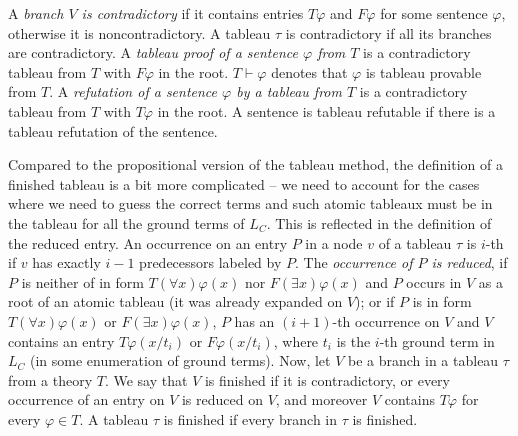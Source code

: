 
A \emph{branch $V$ is contradictory} if it contains entries $T \varphi$ and $F \varphi$ for some sentence $\varphi$, otherwise it is noncontradictory. A tableau $\tau$ is contradictory if all its branches are contradictory. A \emph{tableau proof of a sentence $\varphi$ from $T$} is a contradictory tableau from $T$ with $F \varphi$ in the root. $T \vdash \varphi$ denotes that $\varphi$ is tableau provable from $T$. A \emph{refutation of a sentence $\varphi$ by a tableau from $T$} is a contradictory tableau from $T$ with $T \varphi$ in the root. A sentence is tableau refutable if there is a tableau refutation of the sentence.

Compared to the propositional version of the tableau method, the definition of a finished tableau is a bit more complicated -- we need to account for the cases where we need to guess the correct terms and such atomic tableaux must be in the tableau for all the ground terms of $L_C$. This is reflected in the definition of the reduced entry. An occurrence on an entry $P$ in a node $v$ of a tableau $\tau$ is $i$-th if $v$ has exactly $i-1$ predecessors labeled by $P$. The \emph{occurrence of $P$ is reduced}, if $P$ is neither of in form $T(\forall x)\varphi(x)$ nor $F(\exists x)\varphi(x)$ and $P$ occurs in $V$ as a root of an atomic tableau (it was already expanded on $V$); or if $P$ is in form $T(\forall x)\varphi(x)$ or $F(\exists x)\varphi(x)$, $P$ has an $(i+1)$-th occurrence on $V$ and $V$ contains an entry $T \varphi(x/t_i)$ or $F \varphi(x/t_i)$, where $t_i$ is the $i$-th ground term in $L_C$ (in some enumeration of ground terms). Now, let $V$ be a branch in a tableau $\tau$ from a theory $T$. We say that $V$ is finished if it is contradictory, or every occurrence of an entry on $V$ is reduced on $V$, and moreover $V$ contains $T \varphi$ for every $\varphi \in T$. A tableau $\tau$ is finished if every branch in $\tau$ is finished.

